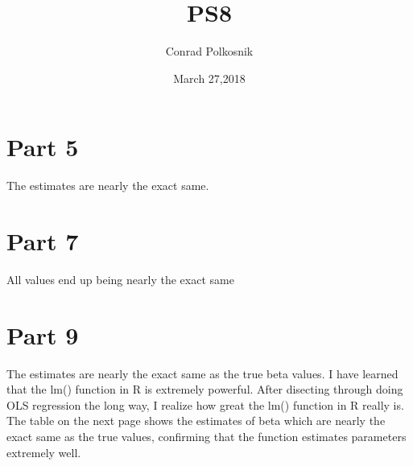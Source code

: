\documentclass{article}
\title{PS8}
\author{Conrad Polkosnik }
\date{March 27,2018}
\begin{document}
\maketitle

\section{Part 5}
The estimates are nearly the exact same.

\section{Part 7}
All values end up being nearly the exact same

\section{Part 9}
The estimates are nearly the exact same as the true beta values. I have learned that the lm() function in R is extremely powerful. After disecting through doing OLS regression the long way, I realize how great the lm() function in R really is. The table on the next page shows the estimates of beta which are nearly the exact same as the true values, confirming that the function estimates parameters extremely well.
\end{document}
